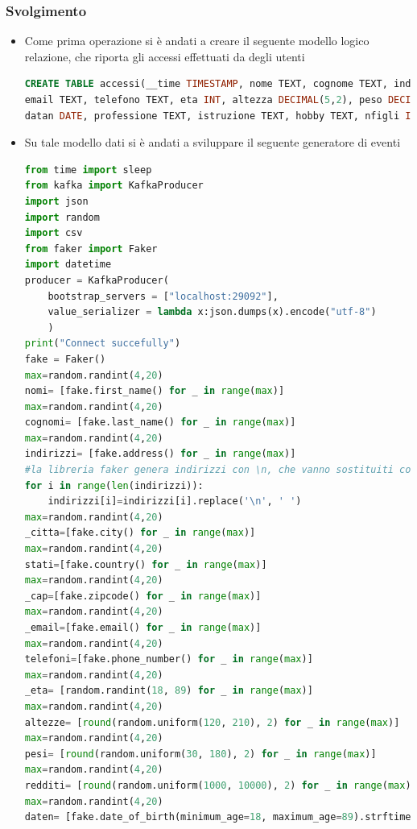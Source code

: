 \documentclass{article}
\begin{document}
\subsubsection{Svolgimento}
\begin{itemize}
    \item Come prima operazione si è andati a creare il seguente modello logico relazione, che riporta gli accessi effettuati da degli utenti
    \begin{lstlisting}[language=SQL]
CREATE TABLE accessi(__time TIMESTAMP, nome TEXT, cognome TEXT, indirizzo TEXT, citta TEXT, stato TEXT, cap INT, 
email TEXT, telefono TEXT, eta INT, altezza DECIMAL(5,2), peso DECIMAL(5,2), reddito DECIMAL(6,2), 
datan DATE, professione TEXT, istruzione TEXT, hobby TEXT, nfigli INT, codice_cliente INT, datareg TIMESTAMP);
    \end{lstlisting}
\item Su tale modello dati si è andati a sviluppare il seguente generatore di eventi
\begin{lstlisting}[language=Python]
from time import sleep  
from kafka import KafkaProducer  
import json 
import random
import csv
from faker import Faker
import datetime
producer = KafkaProducer(  
    bootstrap_servers = ["localhost:29092"],  
    value_serializer = lambda x:json.dumps(x).encode("utf-8")  
    )  
print("Connect succefully") 
fake = Faker()
max=random.randint(4,20)
nomi= [fake.first_name() for _ in range(max)]
max=random.randint(4,20)
cognomi= [fake.last_name() for _ in range(max)]
max=random.randint(4,20)
indirizzi= [fake.address() for _ in range(max)]
#la libreria faker genera indirizzi con \n, che vanno sostituiti con uno spazio
for i in range(len(indirizzi)):
    indirizzi[i]=indirizzi[i].replace('\n', ' ')
max=random.randint(4,20)
_citta=[fake.city() for _ in range(max)]
max=random.randint(4,20)
stati=[fake.country() for _ in range(max)]
max=random.randint(4,20)
_cap=[fake.zipcode() for _ in range(max)]
max=random.randint(4,20)
_email=[fake.email() for _ in range(max)]
max=random.randint(4,20)
telefoni=[fake.phone_number() for _ in range(max)]
max=random.randint(4,20)
_eta= [random.randint(18, 89) for _ in range(max)]
max=random.randint(4,20)
altezze= [round(random.uniform(120, 210), 2) for _ in range(max)]
max=random.randint(4,20)
pesi= [round(random.uniform(30, 180), 2) for _ in range(max)]
max=random.randint(4,20)
redditi= [round(random.uniform(1000, 10000), 2) for _ in range(max)]
max=random.randint(4,20)
daten= [fake.date_of_birth(minimum_age=18, maximum_age=89).strftime("%Y-%m-%d") for _ in range(max)]

\end{lstlisting}
\end{itemize}
\end{document}
